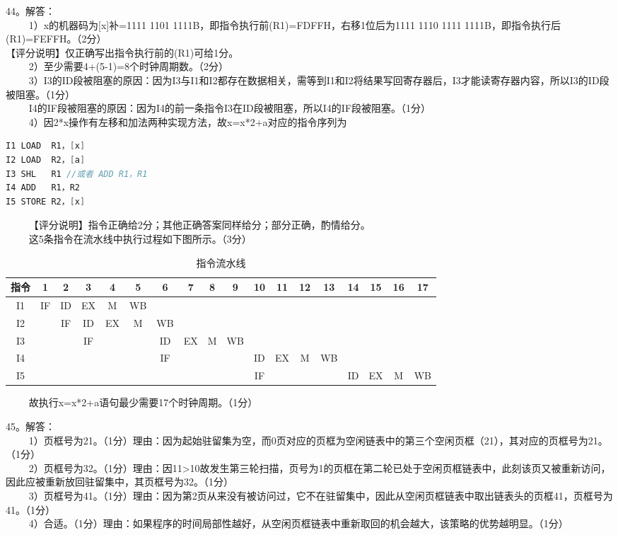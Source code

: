 44。解答： \\
$\qquad$ 1）x的机器码为[x]补=1111 1101 1111B，即指令执行前(R1)=FDFFH，右移1位后为1111 1110 1111 1111B，即指令执行后(R1)=FEFFH。（2分） \\
【评分说明】仅正确写出指令执行前的(R1)可给1分。 \\
$\qquad$ 2）至少需要4+(5-1)=8个时钟周期数。（2分） \\
$\qquad$ 3）I3的ID段被阻塞的原因：因为I3与I1和I2都存在数据相关，需等到I1和I2将结果写回寄存器后，I3才能读寄存器内容，所以I3的ID段被阻塞。（1分） \\
$\qquad$ I4的IF段被阻塞的原因：因为I4的前一条指令I3在ID段被阻塞，所以I4的IF段被阻塞。（1分） \\
$\qquad$ 4）因2*x操作有左移和加法两种实现方法，故x=x*2+a对应的指令序列为 \\
\begin{lstlisting}[language=cpp]
I1 LOAD  R1，[x]
I2 LOAD  R2，[a]
I3 SHL   R1 //或者 ADD R1，R1
I4 ADD   R1，R2
I5 STORE R2，[x]
\end{lstlisting}
$\qquad$ 【评分说明】指令正确给2分；其他正确答案同样给分；部分正确，酌情给分。 \\
$\qquad$ 这5条指令在流水线中执行过程如下图所示。（3分）
\begin{table}[ht]
\centering
\caption{指令流水线}\label{CSN12_tab8}
\begin{tabular}{|c|c|c|c|c|c|c|c|c|c|c|c|c|c|c|c|c|c|}
\hline
指令 & 1 & 2 & 3 & 4 & 5 & 6 & 7 & 8 & 9 & 10 & 11 & 12 & 13 & 14 & 15 & 16 & 17 \\
\hline
I1 & IF & ID & EX & M & WB &  &  &  &  &  &  &  &  &  &  &  &  \\
\hline
I2 &  & IF & ID & EX & M & WB &  &  &  &  &  &  &  &  &  &  &  \\
\hline
I3 &  &  & IF &  &  & ID & EX & M & WB &  &  &  &  &  &  &  &  \\
\hline
I4 &  &  &  &  &  & IF &  &  &  & ID & EX & M & WB & &  &  &  \\
\hline
I5 &  &  &  &  &  &  &  &  &  & IF &  &  &  & ID & EX & M & WB \\
\hline
\end{tabular}
\end{table}
$\qquad$ 故执行x=x*2+a语句最少需要17个时钟周期。（1分）

45。解答：\\
$\qquad$ 1）页框号为21。（1分）理由：因为起始驻留集为空，而0页对应的页框为空闲链表中的第三个空闲页框（21），其对应的页框号为21。（1分） \\
$\qquad$ 2）页框号为32。（1分）理由：因11>10故发生第三轮扫描，页号为1的页框在第二轮已处于空闲页框链表中，此刻该页又被重新访问，因此应被重新放回驻留集中，其页框号为32。（1分） \\
$\qquad$ 3）页框号为41。（1分）理由：因为第2页从来没有被访问过，它不在驻留集中，因此从空闲页框链表中取出链表头的页框41，页框号为41。（1分） \\
$\qquad$ 4）合适。（1分）理由：如果程序的时间局部性越好，从空闲页框链表中重新取回的机会越大，该策略的优势越明显。（1分）

